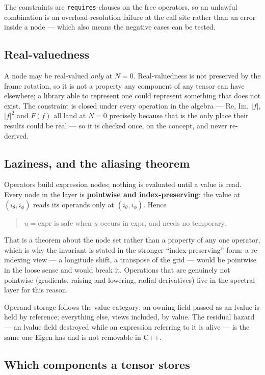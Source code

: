 \documentclass[11pt,a4paper]{article}
\newcommand{\code}[1]{\texttt{#1}}
\begin{document}
The constraints are \code{requires}-clauses on the free operators, so an
unlawful combination is an overload-resolution failure at the call site
rather than an error inside a node --- which also means the negative cases
can be tested.

\subsection{Real-valuedness}

A node may be real-valued \emph{only} at $N=0$.  Real-valuedness is not
preserved by the frame rotation, so it is not a property any component of
any tensor can have elsewhere; a library able to represent one could
represent something that does not exist.  The constraint is closed under
every operation in the algebra --- $\mathrm{Re}$, $\mathrm{Im}$, $|f|$,
$|f|^2$ and $F(f)$ all land at $N=0$ precisely because that is the only
place their results could be real --- so it is checked once, on the
concept, and never re-derived.

\subsection{Laziness, and the aliasing theorem}

Operators build expression nodes; nothing is evaluated until a value is
read.  Every node in the layer is \textbf{pointwise and index-preserving}:
the value at $(i_\theta,i_\phi)$ reads its operands only at
$(i_\theta,i_\phi)$.  Hence
\begin{quote}
  $u = \text{expr}$ is safe when $u$ occurs in $\text{expr}$, and needs no
  temporary.
\end{quote}
That is a theorem about the node set rather than a property of any one
operator, which is why the invariant is stated in the stronger
``index-preserving'' form: a re-indexing view --- a longitude shift, a
transpose of the grid --- would be pointwise in the loose sense and would
break it.  Operations that are genuinely not pointwise (gradients,
raising and lowering, radial derivatives) live in the spectral layer for
this reason.

Operand storage follows the value category: an owning field passed as an
lvalue is held by reference; everything else, views included, by value.
The residual hazard --- an lvalue field destroyed while an expression referring to it is alive ---
is the same one Eigen has and is not removable in C++.

\subsection{Which components a tensor stores}
\label{sec:storedset}
\end{document}
